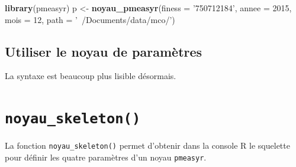 \documentclass[]{book}
\newenvironment{Shaded}{\begin{snugshade}}{\end{snugshade}}
\newcommand{\KeywordTok}[1]{\textcolor[rgb]{0.13,0.29,0.53}{\textbf{#1}}}
\newcommand{\DataTypeTok}[1]{\textcolor[rgb]{0.13,0.29,0.53}{#1}}
\newcommand{\DecValTok}[1]{\textcolor[rgb]{0.00,0.00,0.81}{#1}}
\newcommand{\StringTok}[1]{\textcolor[rgb]{0.31,0.60,0.02}{#1}}
\newcommand{\CommentTok}[1]{\textcolor[rgb]{0.56,0.35,0.01}{\textit{#1}}}
\newcommand{\OperatorTok}[1]{\textcolor[rgb]{0.81,0.36,0.00}{\textbf{#1}}}
\newcommand{\NormalTok}[1]{#1}
\begin{document}
\begin{Shaded}
\begin{Highlighting}[]
\KeywordTok{library}\NormalTok{(pmeasyr)}
\NormalTok{p <-}\StringTok{ }\KeywordTok{noyau_pmeasyr}\NormalTok{(}\DataTypeTok{finess =} \StringTok{'750712184'}\NormalTok{, }
                   \DataTypeTok{annee =} \DecValTok{2015}\NormalTok{, }
                   \DataTypeTok{mois =} \DecValTok{12}\NormalTok{, }
                   \DataTypeTok{path   =} \StringTok{'~/Documents/data/mco/'}\NormalTok{)}
\end{Highlighting}
\end{Shaded}

\subsection{Utiliser le noyau de
paramètres}\label{utiliser-le-noyau-de-parametres}

\begin{Shaded}
\end{Shaded}

\begin{Shaded}
\end{Shaded}

La syntaxe est beaucoup plus lisible désormais.

\section{\texorpdfstring{\texttt{noyau\_skeleton()}}{noyau\_skeleton()}}\label{noyau_skeleton}

La fonction \texttt{noyau\_skeleton()} permet d'obtenir dans la console
R le squelette pour définir les quatre paramètres d'un noyau
\texttt{pmeasyr}.
\end{document}
